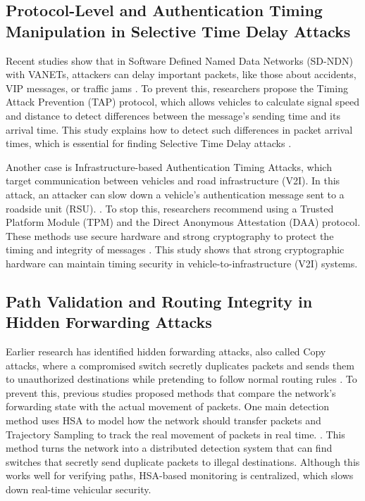 \documentclass[12pt, a4paper]{report}
\begin{document}
\subsection{Protocol-Level and Authentication Timing Manipulation in Selective Time Delay Attacks}

Recent studies show that in Software Defined Named Data Networks (SD-NDN) with VANETs, attackers can delay important packets, like those about accidents, VIP messages, or traffic jams \cite{8616999}. To prevent this, researchers propose the Timing Attack Prevention (TAP) protocol, which allows vehicles to calculate signal speed and distance to detect differences between the message's sending time and its arrival time. This study explains how to detect such differences in packet arrival times, which is essential for finding Selective Time Delay attacks \cite{8616999}.

Another case is Infrastructure-based Authentication Timing Attacks, which target communication between vehicles and road infrastructure (V2I). In this attack, an attacker can slow down a vehicle's authentication message sent to a roadside unit (RSU). \cite{Timing_Attack}. To stop this, researchers recommend using a Trusted Platform Module (TPM) and the Direct Anonymous Attestation (DAA) protocol. These methods use secure hardware and strong cryptography to protect the timing and integrity of messages \cite{Timing_Attack}. This study shows that strong cryptographic hardware can maintain timing security in vehicle-to-infrastructure (V2I) systems.

\subsection{Path Validation and Routing Integrity in Hidden Forwarding Attacks}

Earlier research has identified hidden forwarding attacks, also called Copy attacks, where a compromised switch secretly duplicates packets and sends them to unauthorized destinations while pretending to follow normal routing rules \cite{bu2020unveiling} \cite{mohammadi2016detecting}. To prevent this, previous studies proposed methods that compare the network's forwarding state with the actual movement of packets. One main detection method uses HSA to model how the network should transfer packets and Trajectory Sampling to track the real movement of packets in real time. \cite{mohammadi2016detecting}. This method turns the network into a distributed detection system that can find switches that secretly send duplicate packets to illegal destinations. Although this works well for verifying paths, HSA-based monitoring is centralized, which slows down real-time vehicular security.
\end{document}
